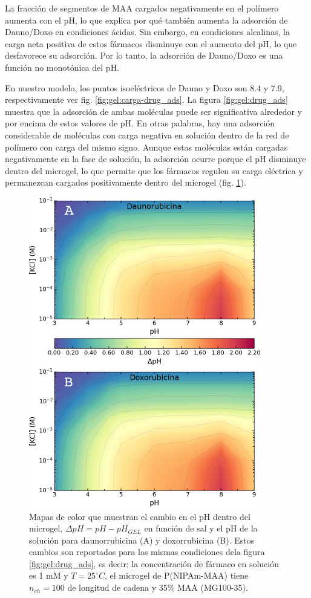 La fracci\'on de segmentos de MAA cargados negativamente en el pol\'imero aumenta con el pH, lo que explica por qu\'e tambi\'en aumenta la adsorci\'on de Dauno/Doxo en condiciones \'acidas. Sin embargo, en condiciones alcalinas, la carga neta positiva de estos f\'armacos disminuye con el aumento del pH, lo que desfavorece su adsorci\'on. Por lo tanto, la adsorci\'on de Dauno/Doxo es una funci\'on no monot\'onica del pH.

En nuestro modelo, los puntos isoel\'ectricos de Dauno y Doxo son 8.4 y 7.9, respectivamente ver fig. \ref{fig:gel:carga-drug_ads}. La figura \ref{fig:gel:drug_ads} muestra que la adsorci\'on de ambas mol\'eculas puede ser significativa alrededor y por encima de estos valores de pH. En otras palabras, hay una adsorci\'on considerable de mol\'eculas con carga negativa en soluci\'on dentro de la red de pol\'imero con carga del mismo signo. Aunque estas mol\'eculas est\'an cargadas negativamente en la fase de soluci\'on, la adsorci\'on ocurre porque el pH disminuye dentro del microgel, lo que permite que los f\'armacos regulen su carga el\'ectrica y permanezcan cargados positivamente dentro del microgel (fig. \ref{fig:gel:drug_pH}).


\begin{figure}[!tb]
	\centering
	\includegraphics[width=0.50\linewidth]{Figures/graph-gel/drug_pH.pdf}
	\caption{Mapas de color que muestran el cambio en el pH dentro del microgel, $\Delta pH = pH - pH_{GEL}$ en funci\'on de sal y el pH de la soluci\'on para daunorrubicina (A) y doxorrubicina (B). Estos cambios son reportados para las mismas condiciones dela figura \ref{fig:gel:drug_ads}, es decir:
		la concentraci\'on de f\'armaco en soluci\'on es 1 mM y $T=25 ^\circ C$,
		el microgel de P(NIPAm-MAA) tiene $n_{ch}=100$ de longitud de cadena y $35\%$ MAA (MG100-35).}
	\label{fig:gel:drug_pH}
\end{figure}

